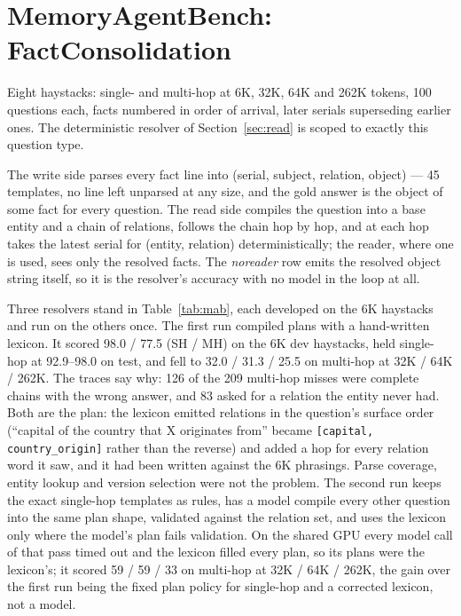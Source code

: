 \documentclass[11pt]{article}
\begin{document}
\section{MemoryAgentBench: FactConsolidation}
\label{sec:mab}

Eight haystacks: single- and multi-hop at 6K, 32K, 64K and 262K tokens, 100
questions each, facts numbered in order of arrival, later serials
superseding earlier ones. The deterministic resolver of
Section~\ref{sec:read} is scoped to exactly this question type.

The write side parses every fact line into (serial, subject, relation,
object) — 45 templates, no line left unparsed at any size, and the gold
answer is the object of some fact for every question. The read side compiles
the question into a base entity and a chain of relations, follows the chain
hop by hop, and at each hop takes the latest serial for (entity, relation)
deterministically; the reader, where one is used, sees only the resolved
facts. The \emph{noreader} row emits the resolved object string itself, so
it is the resolver's accuracy with no model in the loop at all.

Three resolvers stand in Table~\ref{tab:mab}, each developed on the 6K
haystacks and run on the others once. The first run compiled plans with a hand-written lexicon. It scored 98.0 /
77.5 (SH / MH) on the 6K dev haystacks, held single-hop at 92.9--98.0 on
test, and fell to 32.0 / 31.3 / 25.5 on multi-hop at 32K / 64K / 262K. The
traces say why: 126 of the 209 multi-hop misses were complete chains with
the wrong answer, and 83 asked for a relation the entity never had. Both are
the plan: the lexicon emitted relations in the question's surface order
(``capital of the country that X originates from'' became
\texttt{[capital, country\_origin]} rather than the reverse) and added a hop
for every relation word it saw, and it had been written against the 6K
phrasings. Parse coverage, entity lookup and version selection were not the
problem. The second run keeps the exact single-hop templates as rules, has a
model compile every other question into the same plan shape, validated
against the relation set, and uses the lexicon only where the model's plan
fails validation. On the shared GPU every model call of that pass timed
out and the lexicon filled every plan, so its plans were the lexicon's; it
scored 59 / 59 / 33 on multi-hop at 32K / 64K / 262K, the gain over the
first run being the fixed plan policy for single-hop and a corrected
lexicon, not a model.
\end{document}
